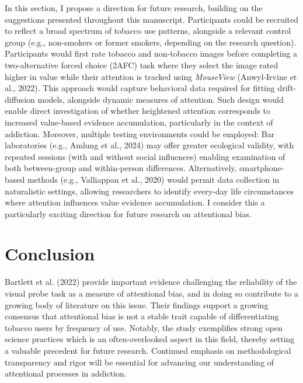 \documentclass[authordate, reflection, issue]{jote-new-article}
\begin{document}
	In this section, I propose a direction for future research, building on the suggestions presented throughout this manuscript. Participants could be recruited to reflect a broad spectrum of tobacco use patterns, alongside a relevant control group (e.g., non-smokers or former smokers, depending on the research question). Participants would first rate tobacco and non-tobacco images before completing a two-alternative forced choice (2AFC) task where they select the image rated higher in value while their attention is tracked using \emph{MouseView }(Anwyl-Irvine et al., 2022). This approach would capture behavioral data required for fitting drift-diffusion models, alongside dynamic measures of attention. Such design would enable direct investigation of whether heightened attention corresponds to increased value-based evidence accumulation, particularly in the context of addiction. Moreover, multiple testing environments could be employed: Bar laboratories (e.g., Amlung et al., 2024) may offer greater ecological validity, with repeated sessions (with and without social influences) enabling examination of both between-group and within-person differences. Alternatively, smartphone-based methods (e.g., Valliappan et al., 2020) would permit data collection in naturalistic settings, allowing researchers to identify every-day life circumstances where attention influences value evidence accumulation. I consider this a particularly exciting direction for future research on attentional bias.



	\section{Conclusion }



	Bartlett et al. (2022) provide important evidence challenging the reliability of the visual probe task as a measure of attentional bias, and in doing so contribute to a growing body of literature on this issue. Their findings support a growing consensus that attentional bias is not a stable trait capable of differentiating tobacco users by frequency of use. Notably, the study exemplifies strong open science practices which is an often-overlooked aspect in this field, thereby setting a valuable precedent for future research. Continued emphasis on methodological transparency and rigor will be essential for advancing our understanding of attentional processes in addiction.
\end{document}
